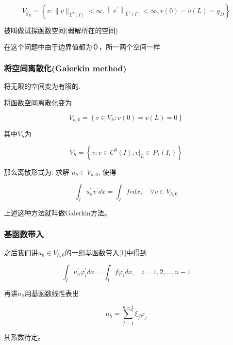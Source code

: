 \documentclass{article}
\begin{document}
\begin{equation*}
V_{g_D}=\left\{v:\|v\|_{L^{2}(I)}<\infty,\left\|v^{\prime}\right\|_{L^{2}(I)}<\infty, v(0)=v(L)=g_D\right\}
\end{equation*}

被叫做试探函数空间(弱解所在的空间)

在这个问题中由于边界值都为０，所一两个空间一样

\subsubsection{将空间离散化(Galerkin method)}

将无限的空间变为有限的.

将函数空间离散化变为

\begin{equation}
V_{h, 0}=\left\{v \in V_{h}: v(0)=v(L)=0\right\}
\end{equation}

其中$V_{h}$为

\begin{equation}
V_{h}=\left\{v: v \in C^{0}(I),\left.v\right|_{I_{i}} \in P_{1}\left(I_{i}\right)\right\}
\end{equation}

那么离散形式为: 求解 $u_h \in V_{h,0}$, 使得

\begin{equation}\label{1}
\int_{I} u_{h}^{\prime} v^{\prime} d x=\int_{I} f v d x, \quad \forall v \in V_{h, 0}
\end{equation}

上述这种方法就叫做Galerkin方法。

\subsubsection{基函数带入}

之后我们讲$u_h \in V_{h,0}$的一组基函数带入\ref{1}中得到

\begin{equation}
\int_{I} u_{h}^{\prime} \varphi_{i}^{\prime} d x=\int_{I} f \varphi_{i} d x, \quad i=1,2, \ldots, n-1
\end{equation}

再讲$u_h$用基函数线性表出

\begin{equation}
u_{h}=\sum_{j=1}^{n-1} \xi_{j} \varphi_{j}
\end{equation}

其系数待定。
\end{document}

